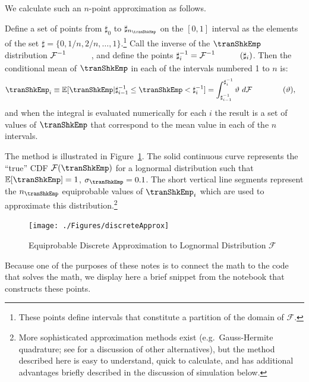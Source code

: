 \documentclass[titlepage, headings=optiontotocandhead]{econtex}
\begin{document}
We calculate such an $n$-point approximation as follows.

Define a set of points from $\sharp_{0}$ to $\sharp_{n_{\tranShkEmp}}$ on the $[0,1]$ interval
as the elements of the set $\sharp = \{0,1/n,2/n, \ldots,1\}$.\footnote{These points define intervals that constitute a partition of the domain of $\mathcal{F}$.}  Call the inverse of the $\tranShkEmp$ distribution $\mathcal{F}^{-1}_{\phantom{\tranShkEmp}}$, and define the
points $\sharp^{-1}_{i} = \mathcal{F}^{-1}_{\phantom{\tranShkEmp}}(\sharp_{i})$.  Then
the conditional mean of $\tranShkEmp$ in each of the intervals numbered 1 to $n$ is:
\begin{equation}\begin{gathered}\begin{aligned}
      \tranShkEmp_{i} \equiv {\mathbb{E}}[\tranShkEmp | \sharp_{i-1}^{-1} \leq \tranShkEmp < \sharp_{i}^{-1}]  & = \int_{\sharp^{-1}_{i-1}}^{\sharp^{-1}_{i}} \vartheta ~ d\mathcal{F}_{\phantom{\tranShkEmp}}(\vartheta)  ,
    \end{aligned}\end{gathered}\end{equation}
and when the integral is evaluated numerically for each $i$ the result is a set of values of $\tranShkEmp$ that correspond to the mean value in each of the $n$ intervals.

The method is illustrated in Figure~\ref{fig:discreteapprox}.  The solid continuous curve represents
the ``true'' CDF $\mathcal{F}(\tranShkEmp)$ for a lognormal distribution such that ${\mathbb{E}}[\tranShkEmp] = 1$, $\sigma_{\tranShkEmp} = 0.1$.  The short vertical line segments represent the $n_{\tranShkEmp}$
equiprobable values of $\tranShkEmp_{i}$ which are used to approximate this
distribution.\footnote{More sophisticated approximation methods exist
  (e.g.\ Gauss-Hermite quadrature; see \cite{kopecky2010finite} for a discussion of other alternatives), but the method described here is easy to understand, quick to calculate, and has additional advantages briefly described in the discussion of simulation below.}
  \hypertarget{discreteApprox}{}
  \begin{figure}
    \texttt{[image: ./Figures/discreteApprox]}
    \caption{Equiprobable Discrete Approximation to Lognormal Distribution $\mathcal{F}$}
    \label{fig:discreteapprox}
  \end{figure}



Because one of the purposes of these notes is to connect the math to the code that solves the math, we display here a brief snippet from the notebook that constructs these points.
\end{document}
